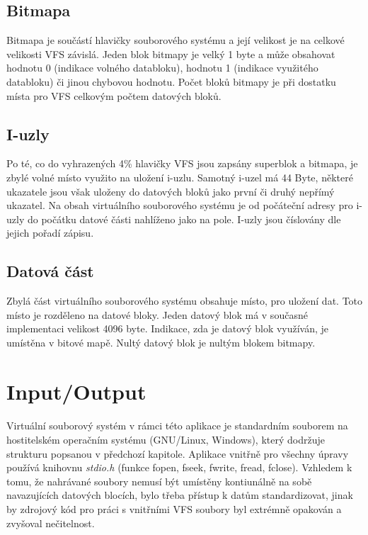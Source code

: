 \documentclass[12pt, a4paper]{article}
\begin{document}
\subsection{Bitmapa}
Bitmapa je součástí hlavičky souborového systému a její velikost je na celkové velikosti VFS závislá. Jeden blok bitmapy je velký 1 byte a může obsahovat hodnotu 0 (indikace volného databloku), hodnotu 1 (indikace využitého databloku) či jinou chybovou hodnotu. Počet bloků bitmapy je při dostatku místa pro VFS celkovým počtem datových bloků. 

\subsection{I-uzly}   
Po té, co do vyhrazených 4\% hlavičky VFS jsou zapsány superblok a bitmapa, je zbylé volné místo využito na uložení i-uzlu. Samotný i-uzel má 44 Byte, některé ukazatele jsou však uloženy do datových bloků jako první či druhý nepřímý ukazatel. Na obsah virtuálního souborového systému je od počáteční adresy pro i-uzly do počátku datové části nahlíženo jako na pole. I-uzly jsou číslovány dle jejich pořadí zápisu. 

\subsection{Datová část}
Zbylá část virtuálního souborového systému obsahuje místo, pro uložení dat. Toto místo je rozděleno na datové bloky. Jeden datový blok má v současné implementaci velikost 4096 byte. Indikace, zda je datový blok využíván, je umístěna v bitové mapě. Nultý datový blok je nultým blokem bitmapy. 

\newpage
\section{Input/Output}
\paragraph{}
Virtuální souborový systém v rámci této aplikace je standardním souborem na hostitelském operačním systému (GNU/Linux, Windows), který dodržuje strukturu popsanou v předchozí kapitole. Aplikace vnitřně pro všechny úpravy používá knihovnu \textit{stdio.h} (funkce fopen, fseek, fwrite, fread, fclose). Vzhledem k tomu, že nahrávané soubory nemusí být umístěny kontiunálně na sobě navazujících datových blocích, bylo třeba přístup k datům standardizovat, jinak by zdrojový kód pro práci s vnitřními VFS soubory byl extrémně opakován a zvyšoval nečitelnost.    
  
\end{document}
